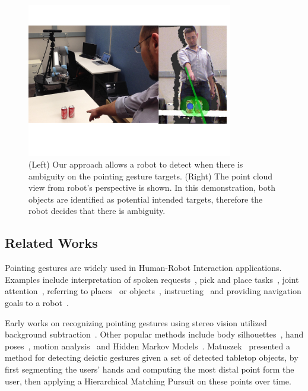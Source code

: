 \begin{figure}[ht!]
\centering
\includegraphics[width=0.8\textwidth]{pics/cover_pointing_gestures}
\caption{(Left) Our approach allows a robot to detect when there is ambiguity on the pointing gesture targets. (Right) The point cloud view from robot's perspective is shown. In this demonstration, both objects are identified as potential intended targets, therefore the robot decides that there is ambiguity.}
\label{fig:cover_pointing_gestures}
\end{figure}

\subsection{Related Works}
\label{sec:pointing_related_works}

Pointing gestures are widely used in Human-Robot Interaction applications. Examples include interpretation of spoken requests~\cite{zukerman2010interpreting}, pick and place tasks~\cite{blodow2011inferring}, joint attention~\cite{droeschel2011towards}, referring to places~\cite{hato2010pointing} or objects~\cite{schmidt2008interacting}, instructing~\cite{martin2010estimation} and providing navigation goals to a robot~\cite{raza2013human}. 

Early works on recognizing pointing gestures using stereo vision utilized background subtraction~\cite{cipolla1996human,jojic2000detection,kahn1995understanding}. Other popular methods include body silhouettes~\cite{kehl2004real}, hand poses~\cite{hu2010hand}, motion analysis~\cite{matikainen2011prop} and Hidden Markov Models~\cite{wilson1999parametric, bennewitz2008robust, li2005hierarchical, nickel2003pointing, droeschel2011learning, aly2012integrated}. Matuszek~\cite{matuszek2014learning} presented a method for detecting deictic gestures given a set of detected tabletop objects, by first segmenting the users' hands and computing the most distal point form the user, then applying a Hierarchical Matching Pursuit on these points over time. 

